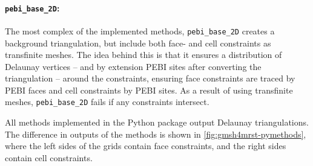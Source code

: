 \paragraph{\texttt{pebi\_base\_2D}:}
The most complex of the implemented methods, \verb|pebi_base_2D| creates a background triangulation, but include both face- and cell constraints as transfinite meshes. The idea behind this is that it ensures a distribution of Delaunay vertices -- and by extension PEBI sites after converting the triangulation -- around the constraints, ensuring face constraints are traced by PEBI faces and cell constraints by PEBI sites. As a result of using transfinite meshes, \verb|pebi_base_2D| fails if any constraints intersect.

All methods implemented in the Python package output Delaunay triangulations. The difference in outputs of the methods is shown in \autoref{fig:gmsh4mrst-pymethods}, where the left sides of the grids contain face constraints, and the right sides contain cell constraints.


